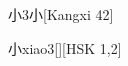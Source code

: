 \begin{entry}{小}{3}{⼩}[Kangxi 42]
  \begin{phonetics}{小}{xiao3}[][HSK 1,2]
  \end{phonetics}
\end{entry}
